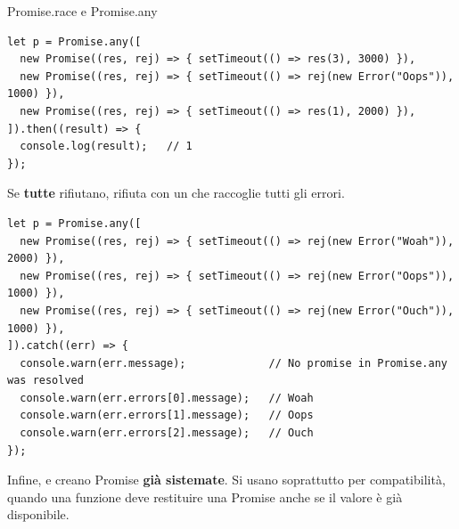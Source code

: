 \begin{esempio}{Promise.race e Promise.any}
\begin{affianco}[0.62][c]
\codicepiccolo
\begin{lstlisting}[style=js, name=promise-any.js]
let p = Promise.any([
  new Promise((res, rej) => { setTimeout(() => res(3), 3000) }),
  new Promise((res, rej) => { setTimeout(() => rej(new Error("Oops")), 1000) }),
  new Promise((res, rej) => { setTimeout(() => res(1), 2000) }),
]).then((result) => {
  console.log(result);   // 1
});
\end{lstlisting}
\risultato
\begin{immagine}
\end{immagine}
\end{affianco}

Se \textbf{tutte} rifiutano,  rifiuta con un
 che raccoglie tutti gli errori.

\begin{lstlisting}[style=js, name=promise-any2.js]
let p = Promise.any([
  new Promise((res, rej) => { setTimeout(() => rej(new Error("Woah")), 2000) }),
  new Promise((res, rej) => { setTimeout(() => rej(new Error("Oops")), 1000) }),
  new Promise((res, rej) => { setTimeout(() => rej(new Error("Ouch")), 1000) }),
]).catch((err) => {
  console.warn(err.message);             // No promise in Promise.any was resolved
  console.warn(err.errors[0].message);   // Woah
  console.warn(err.errors[1].message);   // Oops
  console.warn(err.errors[2].message);   // Ouch
});
\end{lstlisting}
\end{esempio}

Infine,  e  creano
Promise \textbf{già sistemate}. Si usano soprattutto per compatibilità, quando
una funzione deve restituire una Promise anche se il valore è già disponibile.

